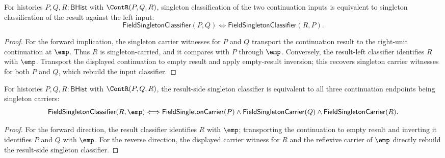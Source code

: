 \begin{theorem}
\label{thm:field-singleton-classifier-continuation-result-left}
For histories $P,Q,R:\mathsf{BHist}$ with $\ContR(P,Q,R)$, singleton
classification of the two continuation inputs is equivalent to singleton
classification of the result against the left input:
$$
\mathsf{FieldSingletonClassifier}(P,Q)
\Longleftrightarrow
\mathsf{FieldSingletonClassifier}(R,P).
$$
\end{theorem}
\begin{proof}
For the forward implication, the singleton carrier witnesses for $P$ and $Q$
transport the continuation result to the right-unit continuation at $\emp$.
Thus $R$ is singleton-carried, and it compares with $P$ through $\emp$.
Conversely, the result-left classifier identifies $R$ with $\emp$. Transport
the displayed continuation to empty result and apply empty-result inversion;
this recovers singleton carrier witnesses for both $P$ and $Q$, which rebuild
the input classifier.
\end{proof}

\begin{theorem}
\label{thm:field-singleton-classifier-continuation-result-endpoint-split}
For histories $P,Q,R:\mathsf{BHist}$ with $\ContR(P,Q,R)$, the result-side
singleton classifier is equivalent to all three continuation endpoints being
singleton carriers:
$$
\mathsf{FieldSingletonClassifier}(R,\emp)
\Longleftrightarrow
\mathsf{FieldSingletonCarrier}(P)\land
\mathsf{FieldSingletonCarrier}(Q)\land
\mathsf{FieldSingletonCarrier}(R).
$$
\end{theorem}
\begin{proof}
For the forward direction, the result classifier identifies $R$ with $\emp$;
transporting the continuation to empty result and inverting it identifies
$P$ and $Q$ with $\emp$. For the reverse direction, the displayed carrier
witness for $R$ and the reflexive carrier of $\emp$ directly rebuild the
result-side singleton classifier.
\end{proof}

